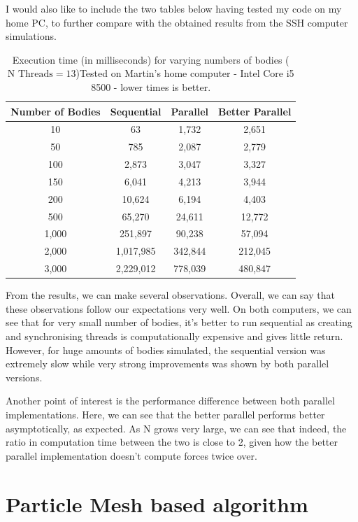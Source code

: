 \documentclass{article}
\begin{document}
I would also like to include the two tables below having tested my code on my home PC, to further compare with the obtained results from the SSH computer simulations.

\begin{table}[htbp]
\centering
\begin{tabular}{|c|c|c|c|}
\hline
\textbf{Number of Bodies} & \textbf{Sequential} & \textbf{Parallel} & \textbf{Better Parallel} \\
\hline
10     & 63  & 1,732  & 2,651   \\
50    & 785  & 2,087  & 2,779   \\
100   & 2,873  & 3,047  & 3,327   \\
150 & 6,041 & 4,213 & 3,944\\
200 & 10,624 & 6,194 & 4,403 \\ 
500 & 65,270 & 24,611 & 12,772 \\
1,000  &  251,897 & 90,238  &  57,094  \\
2,000 & 1,017,985& 342,844& 212,045\\
3,000 & 2,229,012 & 778,039 & 480,847 \\
\hline
\end{tabular}
\caption{Execution time (in milliseconds) for varying numbers of bodies ($\text{N Threads} = 13$)Tested on Martin's home computer - Intel Core i5 8500 - lower times is better.}
\label{tab:thread_performance}
\end{table}

From the results, we can make several observations. Overall, we can say that these observations follow our expectations very well. On both computers, we can see that for very small number of bodies, it's better to run sequential as creating and synchronising threads is computationally expensive and gives little return. However, for huge amounts of bodies simulated, the sequential version was extremely slow while very strong improvements was shown by both parallel versions.

Another point of interest is the performance difference between both parallel implementations. Here, we can see that the better parallel performs better asymptotically, as expected. As N grows very large, we can see that indeed, the ratio in computation time between the two is close to 2, given how the better parallel implementation doesn't compute forces twice over.



\section{Particle Mesh based algorithm}
\end{document}
